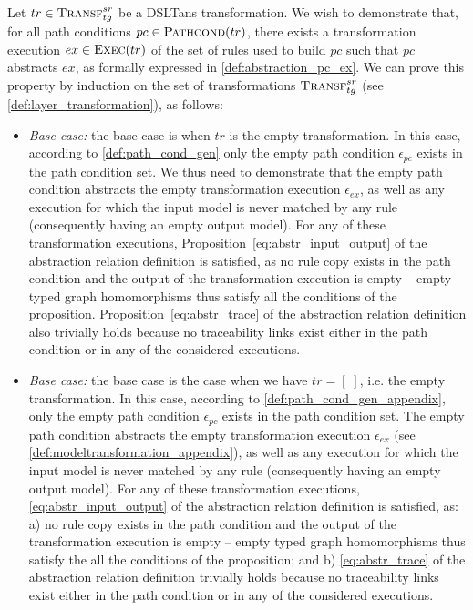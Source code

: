 \begin{ps}

Let $tr\in \textsc{Transf}^{sr}_{tg}$ be a DSLTans transformation. We wish to demonstrate that, for all path conditions $pc\in \textsc{Pathcond}(tr)$, there exists a transformation execution $ex\in \textsc{Exec}(tr)$ of the set of
rules used to build $pc$ such that $pc$ abstracts $ex$, as formally expressed in \cref{def:abstraction_pc_ex}. We can prove this property by induction on the set of transformations $\textsc{Transf}^{sr}_{tg}$ (see \cref{def:layer_transformation}), as follows:

\begin{itemize}
  \item \emph{Base case:} the base case is when $tr$ is the empty
  transformation. In this case, according to \cref{def:path_cond_gen} only the
  empty path condition $\epsilon_{pc}$ exists in the path condition set. We thus
  need to demonstrate that the empty path condition abstracts the empty
  transformation execution $\epsilon_{ex}$, as well as any execution for which
  the input model is never matched by any rule (consequently having an empty
  output model). For any of these transformation executions, Proposition~\ref{eq:abstr_input_output} of the abstraction relation definition is satisfied, as no rule copy exists in the path condition and the output of the transformation execution is empty -- empty typed graph homomorphisms thus satisfy all the conditions of the proposition. Proposition~\ref{eq:abstr_trace} of the abstraction relation definition also trivially holds because no traceability links exist either in the path condition or in any of the considered executions.
  
 
   \item \emph{Base case:} the base case is the case when we have $tr=[\;]$, i.e. the empty transformation. In this case, according to \cref{def:path_cond_gen_appendix}, only the empty path condition $\epsilon_{pc}$ exists in the path condition set. The empty path condition abstracts the empty transformation execution $\epsilon_{ex}$ (see \cref{def:modeltransformation_appendix}), as well as any execution for which the input model is never matched by any rule (consequently having an empty output model). For any of these transformation executions, \cref{eq:abstr_input_output} of the abstraction relation definition is satisfied, as: a) no rule copy exists in the path condition and the output of the transformation execution is empty -- empty typed graph homomorphisms thus satisfy the all the conditions of the proposition; and b) \cref{eq:abstr_trace} of the abstraction relation definition trivially holds because no traceability links exist either in the path condition or in any of the considered executions.
   

\end{itemize}
\end{ps}
